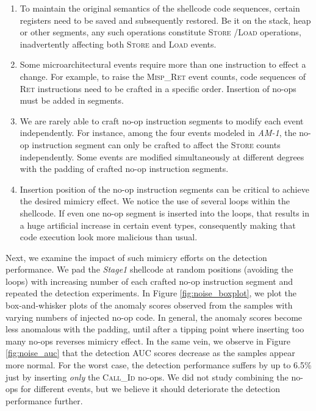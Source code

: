 \documentclass{acm_proc_article-sp}
\begin{document}
\begin{enumerate}
	\item To maintain the original semantics of the shellcode code sequences, certain registers need to be saved and subsequently restored. Be it on the stack, heap or other segments, any such operations constitute \textsc{Store} /\textsc{Load} operations, inadvertently affecting both \textsc{Store} and \textsc{Load} events.
	\item Some microarchitectural events require more than one instruction to effect a change. For example, to raise the \textsc{Misp\_Ret} event counts, code sequences of \textsc{Ret} instructions need to be crafted in a specific order. Insertion of no-ops must be added in segments.
	\item We are rarely able to craft no-op instruction segments to modify each event independently. For instance, among the four events modeled in \textit{AM-1}, the no-op instruction segment can only be crafted to affect the \textsc{Store} counts independently. Some events are modified simultaneously at different degrees with the padding of crafted no-op instruction segments.
	\item Insertion position of the no-op instruction segments can be critical to achieve the desired mimicry effect. We notice the use of several loops within the shellcode. If even one no-op segment is inserted into the loops, that results in a huge artificial increase in certain event types, consequently making that code execution look more malicious than usual.
\end{enumerate}

Next, we examine the impact of such mimicry efforts on the detection performance. We pad the \textit{Stage1} shellcode at random positions (avoiding the loops) with increasing number of each crafted no-op instruction segment and repeated the detection experiments. In Figure \ref{fig:noise_boxplot}, we plot the box-and-whisker plots of the anomaly scores observed from the samples with varying numbers of injected no-op code. In general, the anomaly scores become less anomalous with the padding, until after a tipping point where inserting too many no-ops reverses mimicry effect. In the same vein, we observe in Figure \ref{fig:noise_auc} that the detection AUC scores decrease as the samples appear more normal. For the worst case, the detection performance suffers by up to 6.5\% just by inserting \textit{only} the \textsc{Call\_Id} no-ops. We did not study combining the no-ops for different events, but we believe it should deteriorate the detection performance further.
\end{document}
